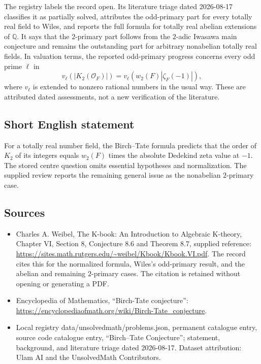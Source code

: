 \documentclass[11pt]{article}
\newcommand{\Q}{\mathbb{Q}}
\begin{document}
The registry labels the record open. Its literature triage dated 2026-08-17 classifies it as partially solved, attributes the odd-primary part for every totally real field to Wiles, and reports the full formula for totally real abelian extensions of $\Q$. It says that the $2$-primary part follows from the $2$-adic Iwasawa main conjecture and remains the outstanding part for arbitrary nonabelian totally real fields. In valuation terms, the reported odd-primary progress concerns every odd prime $\ell$ in
\[
v_\ell(|K_2(\mathcal O_F)|)=v_\ell(w_2(F)|\zeta_F(-1)|),
\]
where $v_\ell$ is extended to nonzero rational numbers in the usual way. These are attributed dated assessments, not a new verification of the literature.
\subsection{Short English statement}
For a totally real number field, the Birch--Tate formula predicts that the order of $K_2$ of its integers equals $w_2(F)$ times the absolute Dedekind zeta value at $-1$. The stored centre question omits essential hypotheses and normalization. The supplied review reports the remaining general issue as the nonabelian $2$-primary case.
\subsection{Sources}
\begin{itemize}
\item Charles A. Weibel, The K-book: An Introduction to Algebraic K-theory, Chapter VI, Section 8, Conjecture 8.6 and Theorem 8.7, supplied reference: \url{https://sites.math.rutgers.edu/~weibel/Kbook/Kbook.VI.pdf}. The record cites this for the normalized formula, Wiles's odd-primary result, and the abelian and remaining $2$-primary cases. The citation is retained without opening or generating a PDF.
\item Encyclopedia of Mathematics, ``Birch-Tate conjecture'': \url{https://encyclopediaofmath.org/wiki/Birch-Tate_conjecture}.
\item Local registry data/unsolvedmath/problems.json, permanent catalogue entry, source code catalogue entry, ``Birch--Tate Conjecture''; statement, background, and literature triage dated 2026-08-17. Dataset attribution: Ulam AI and the UnsolvedMath Contributors.
\end{itemize}
\end{document}
